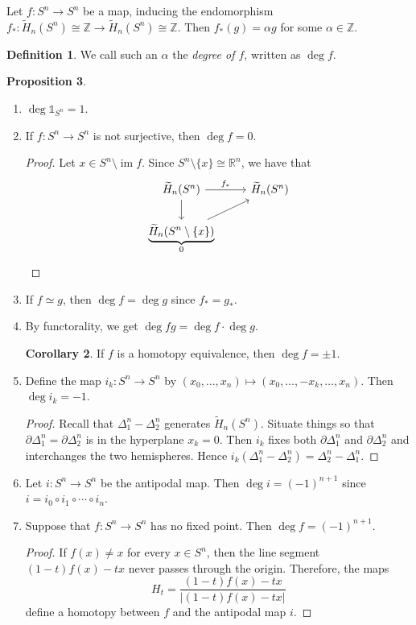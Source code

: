 \documentclass[10pt,letterpaper,cm]{nupset}
\theoremstyle{definition}
\newtheorem{definition}{Definition}[subsection]
\theoremstyle{theorem}
\newtheorem{prop}[definition]{Proposition}
\newtheorem{corollary}[definition]{Corollary}
\theoremstyle{remark}
\newcommand{\R}{\mathbb{R}}
\newcommand{\Z}{\mathbb Z}
\newcommand{\1}{\mathbb{1}}
\newcommand{\0}{\vec 0}
\DeclareMathOperator{\im}{im}
\begin{document}
\smallskip

Let $f: S^n \to S^n$ be a map, inducing the endomorphism $f_{\ast} : \widetilde{H}_n(S^n) \cong \Z \to \widetilde{H}_n(S^n) \cong \Z$. Then $f_{\ast}(g) = \alpha g$ for some $\alpha \in \Z$. 

\begin{definition}
We call such an $\alpha$ the \textit{degree of $f$}, written as $\deg{f}$.
\end{definition}

\begin{prop} $ $
\begin{enumerate}
\item $\deg{\1_{S^n}}=1$.
\item If $f: S^n \to S^n$ is not surjective, then $\deg{f} = 0$.
\begin{proof}
Let $x\in S^n \setminus \im{f}$. Since $S^n \setminus \{x\} \cong \R^n$, we have that 
\[
\begin{tikzcd}
\widetilde{H}_n(S^n) \arrow[r, "f_{\ast}"] \arrow[d] & \widetilde{H}_n(S^n) \\
\underbrace{\widetilde{H}_n(S^n \setminus \{x\})}_{0} \arrow[ru]      &                     
\end{tikzcd}
\]
\end{proof}
\item If $f \simeq g$, then $\deg{f} = \deg{g}$ since $f_{\ast} = g_{\ast}$.
\item By functorality, we get $\deg{fg}= \deg{f}\cdot \deg{g}$.
\begin{corollary}
If $f$ is a homotopy equivalence, then $\deg{f}= \pm 1$.
\end{corollary}
\item Define the map $i_k : S^n \to S^n$ by $\left(x_0, \ldots, x_n\right) \mapsto \left(x_0, \ldots, {-x_k}, \ldots, x_n\right)$. Then $\deg{i_k} = {-1}$.
\begin{proof}
Recall that $\Delta_1^n -\Delta_2^n$ generates $\widetilde{H}_n(S^n)$. Situate things so that $\partial{\Delta_1^n} = \partial{\Delta_2^n}$ is in the hyperplane $x_k=0$. Then $i_k$ fixes both $\partial{\Delta_1^n}$ and $\partial{\Delta_2^n}$ and interchanges the two hemispheres. Hence $i_k(\Delta_1^n -\Delta_2^n)= \Delta_2^n- \Delta_1^n $.
\end{proof}
\item Let $i: S^n \to S^n$ be the antipodal map. Then $\deg{i} = \left({-1}\right)^{n+1}$ since $i= i_0 \circ i_1 \circ \cdots \circ i_n$.
\item Suppose that $f: S^n \to S^n$ has no fixed point. Then $\deg{f}= \left({-1}\right)^{n+1}$.
\begin{proof}
If $f(x) \ne x$ for every $x\in S^n$, then the line segment $\left(1-t\right)f(x) - tx$ never passes through the origin. Therefore, the maps $$H_t = \frac{ (1-t)f(x)-tx  }{\left\lvert{(1-t)f(x) -tx}\right\rvert     }$$ define a homotopy between $f$ and the antipodal map $i$.
\end{proof}
\end{enumerate}
\end{prop}
\end{document}
